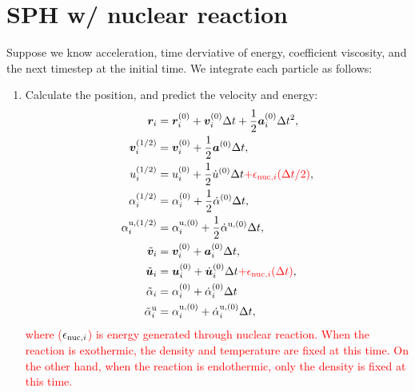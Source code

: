 \documentclass[fleqn,dvipdfmx]{article}
\newcommand{\redtext}[1]{\textcolor{red}{#1}}
\begin{document}
\section{SPH w/ nuclear reaction}

Suppose we know acceleration, time derviative of energy, coefficient
viscosity, and the next timestep at the initial time. We integrate
each particle as follows:
\begin{enumerate}
\item Calculate the position, and predict the velocity and energy:
  \begin{align}
    \bm{r}_{i} &= \bm{r}^{(0)}_i + \bm{v}^{(0)}_i \Delta t +
    \frac{1}{2} \bm{a}^{(0)}_i \Delta t^2, \\
    \bm{v}^{(1/2)}_i &= \bm{v}^{(0)}_i + \frac{1}{2} \bm{a}^{(0)}
    \Delta t, \\
    u^{(1/2)}_i &= u^{(0)}_i + \frac{1}{2} \dot{u}^{(0)} \Delta t
    \redtext{+ \epsilon_{{\rm nuc},i}(\Delta t/2)}, \\
    \alpha^{(1/2)}_i &= \alpha^{(0)}_i + \frac{1}{2}
    \dot{\alpha}^{(0)} \Delta t, \\
    \alpha^{{\rm u},(1/2)}_i &= \alpha^{{\rm u},(0)}_i + \frac{1}{2}
    \dot{\alpha}^{{\rm u},(0)} \Delta t, \\
    \tilde{\bm{v}}_{i} &= \bm{v}^{(0)}_i + \bm{a}^{(0)}_i \Delta t, \\
    \tilde{\bm{u}}_{i} &= \bm{u}^{(0)}_i + \dot{\bm{u}}^{(0)}_i \Delta
    t \redtext{+ \epsilon_{{\rm nuc},i}(\Delta t)}, \\
    \tilde{\alpha}_i &= \alpha^{(0)}_i + \dot{\alpha}^{(0)}_i \Delta t
    \\
    \tilde{\alpha}^{\rm u}_i &= \alpha^{{\rm u},(0)}_i +
    \dot{\alpha}^{{\rm u},(0)}_i \Delta t,
  \end{align}
  \redtext{where ($\epsilon_{{\rm nuc},i}$) is energy generated
    through nuclear reaction. When the reaction is exothermic, the
    density and temperature are fixed at this time. On the other hand,
    when the reaction is endothermic, only the density is fixed at
    this time.}


\end{enumerate}
\end{document}
